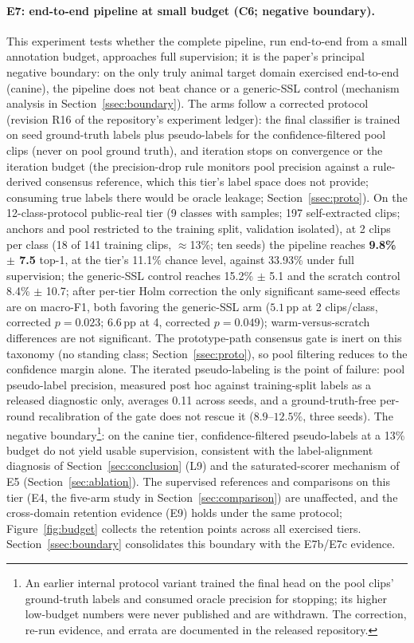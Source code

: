 \paragraph{E7: end-to-end pipeline at small budget (C6; negative boundary).}
This experiment tests whether the complete pipeline, run end-to-end from a small annotation budget, approaches full supervision; it is the paper's principal negative boundary: on the only truly animal target domain exercised end-to-end (canine), the pipeline does not beat chance or a generic-SSL control (mechanism analysis in Section~\ref{ssec:boundary}). The arms follow a corrected protocol (revision R16 of the repository's experiment ledger): the final classifier is trained on seed ground-truth labels plus pseudo-labels for the confidence-filtered pool clips (never on pool ground truth), and iteration stops on convergence or the iteration budget (the precision-drop rule monitors pool precision against a rule-derived consensus reference, which this tier's label space does not provide; consuming true labels there would be oracle leakage; Section~\ref{ssec:proto}). On the 12-class-protocol public-real tier (9 classes with samples; 197 self-extracted clips; anchors and pool restricted to the training split, validation isolated), at 2 clips per class (18 of 141 training clips, $\approx$13\%; ten seeds) the pipeline reaches \textbf{9.8\% $\pm$ 7.5} top-1, at the tier's 11.1\% chance level, against 33.93\% under full supervision; the generic-SSL control reaches 15.2\% $\pm$ 5.1 and the scratch control 8.4\% $\pm$ 10.7; after per-tier Holm correction the only significant same-seed effects are on macro-F1, both favoring the generic-SSL arm ($5.1$\,pp at 2 clips/class, corrected $p=0.023$; $6.6$\,pp at 4, corrected $p=0.049$); warm-versus-scratch differences are not significant. The prototype-path consensus gate is inert on this taxonomy (no standing class; Section~\ref{ssec:proto}), so pool filtering reduces to the confidence margin alone. The iterated pseudo-labeling is the point of failure: pool pseudo-label precision, measured post hoc against training-split labels as a released diagnostic only, averages 0.11 across seeds, and a ground-truth-free per-round recalibration of the gate does not rescue it ($8.9$--$12.5\%$, three seeds). The negative boundary\footnote{An earlier internal protocol variant trained the final head on the pool clips' ground-truth labels and consumed oracle precision for stopping; its higher low-budget numbers were never published and are withdrawn. The correction, re-run evidence, and errata are documented in the released repository.}: on the canine tier, confidence-filtered pseudo-labels at a 13\% budget do not yield usable supervision, consistent with the label-alignment diagnosis of Section~\ref{sec:conclusion} (L9) and the saturated-scorer mechanism of E5 (Section~\ref{sec:ablation}). The supervised references and comparisons on this tier (E4, the five-arm study in Section~\ref{sec:comparison}) are unaffected, and the cross-domain retention evidence (E9) holds under the same protocol; Figure~\ref{fig:budget} collects the retention points across all exercised tiers. Section~\ref{ssec:boundary} consolidates this boundary with the E7b/E7c evidence.

